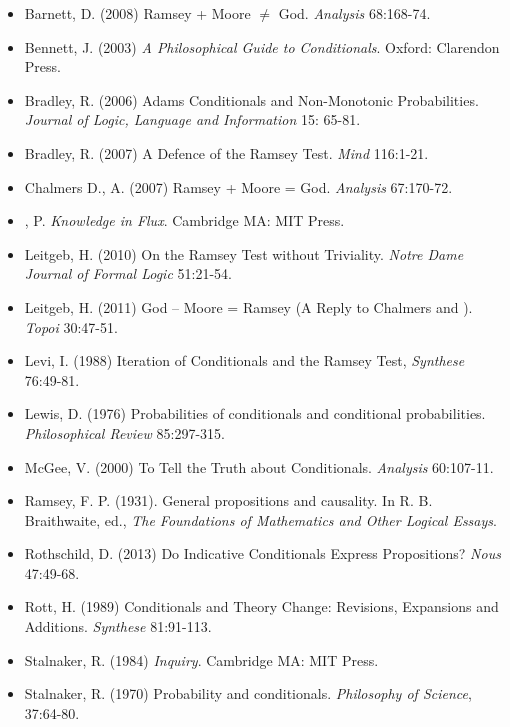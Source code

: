 \documentclass[12pt]{article}
\begin{document}
\begin{itemize}
    \item Barnett, D. (2008) Ramsey + Moore $\neq$ God. \textit{Analysis} 68:168-74.
    \item Bennett, J. (2003) \textit{A Philosophical Guide to Conditionals}. Oxford: Clarendon Press.
    \item Bradley, R. (2006) Adams Conditionals and Non-Monotonic Probabilities. \textit{Journal of Logic, Language and Information} 15: 65-81.
    \item Bradley, R. (2007) A Defence of the Ramsey Test. \textit{Mind} 116:1-21.
    \item Chalmers D., \hjk{} A. (2007) Ramsey + Moore = God. \textit{Analysis} 67:170-72.
    \item \gf{}, P. \textit{Knowledge in Flux}. Cambridge MA: MIT Press.
    \item Leitgeb, H. (2010) On the Ramsey Test without Triviality. \textit{Notre Dame Journal of Formal Logic} 51:21-54.
    \item Leitgeb, H. (2011) God -- Moore = Ramsey (A Reply to Chalmers and \hjk). \textit{Topoi} 30:47-51.
    \item Levi, I. (1988) Iteration of Conditionals and the Ramsey Test, \textit{Synthese} 76:49-81.
    \item Lewis, D. (1976) Probabilities of conditionals and conditional probabilities. \textit{Philosophical Review} 85:297-315.
    \item McGee, V. (2000) To Tell the Truth about Conditionals. \textit{Analysis} 60:107-11.
    \item Ramsey, F. P. (1931). General propositions and causality. In R. B. Braithwaite, ed., \textit{The Foundations of Mathematics and Other Logical Essays}.
    \item Rothschild, D. (2013) Do Indicative Conditionals Express Propositions? \textit{Nous} 47:49-68.
    \item Rott, H. (1989) Conditionals and Theory Change: Revisions, Expansions and Additions. \textit{Synthese} 81:91-113.
    \item Stalnaker, R. (1984) \textit{Inquiry}. Cambridge MA: MIT Press.
    \item Stalnaker, R. (1970) Probability and conditionals. \textit{Philosophy of Science}, 37:64-80.
\end{itemize}
\end{document}
